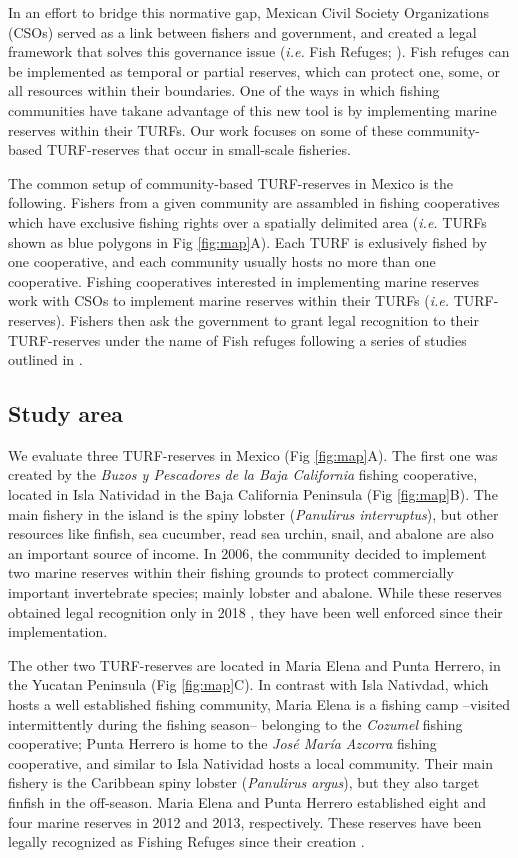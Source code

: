 \documentclass{frontiersSCNS}
\begin{document}
In an effort to bridge this normative gap, Mexican Civil Society
Organizations (CSOs) served as a link between fishers and government,
and created a legal framework that solves this governance issue
(\emph{i.e.} Fish Refuges; \citet{nom}). Fish refuges can be implemented
as temporal or partial reserves, which can protect one, some, or all
resources within their boundaries. One of the ways in which fishing
communities have takane advantage of this new tool is by implementing
marine reserves within their TURFs. Our work focuses on some of these
community-based TURF-reserves that occur in small-scale fisheries.

The common setup of community-based TURF-reserves in Mexico is the
following. Fishers from a given community are assambled in fishing
cooperatives which have exclusive fishing rights over a spatially
delimited area (\emph{i.e.} TURFs shown as blue polygons in Fig
\ref{fig:map}A). Each TURF is exlusively fished by one cooperative, and
each community usually hosts no more than one cooperative. Fishing
cooperatives interested in implementing marine reserves work with CSOs
to implement marine reserves within their TURFs (\emph{i.e.}
TURF-reserves). Fishers then ask the government to grant legal
recognition to their TURF-reserves under the name of Fish refuges
following a series of studies outlined in \citet{nom}.

\hypertarget{study-area}{%
\subsection{Study area}\label{study-area}}

We evaluate three TURF-reserves in Mexico (Fig \ref{fig:map}A). The
first one was created by the \emph{Buzos y Pescadores de la Baja
California} fishing cooperative, located in Isla Natividad in the Baja
California Peninsula (Fig \ref{fig:map}B). The main fishery in the
island is the spiny lobster (\emph{Panulirus interruptus}), but other
resources like finfish, sea cucumber, read sea urchin, snail, and
abalone are also an important source of income. In 2006, the community
decided to implement two marine reserves within their fishing grounds to
protect commercially important invertebrate species; mainly lobster and
abalone. While these reserves obtained legal recognition only in 2018
\citep{dof_website_2018}, they have been well enforced since their
implementation.

The other two TURF-reserves are located in Maria Elena and Punta
Herrero, in the Yucatan Peninsula (Fig \ref{fig:map}C). In contrast with
Isla Nativdad, which hosts a well established fishing community, Maria
Elena is a fishing camp --visited intermittently during the fishing
season-- belonging to the \emph{Cozumel} fishing cooperative; Punta
Herrero is home to the \emph{José María Azcorra} fishing cooperative,
and similar to Isla Natividad hosts a local community. Their main
fishery is the Caribbean spiny lobster (\emph{Panulirus argus}), but
they also target finfish in the off-season. Maria Elena and Punta
Herrero established eight and four marine reserves in 2012 and 2013,
respectively. These reserves have been legally recognized as Fishing
Refuges since their creation \citep{dof_website_2012,dof_website_2013}.
\end{document}
